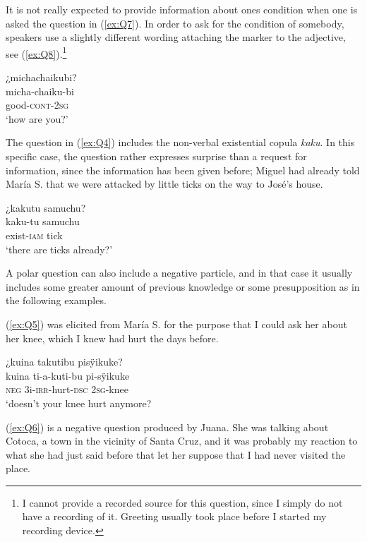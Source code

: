 It is not really expected to provide information about ones condition when one is asked the question in (\ref{ex:Q7}). In order to ask for the condition of somebody, speakers use a slightly different wording attaching the  marker to the adjective, see (\ref{ex:Q8}).\footnote{I cannot provide a recorded source for this question, since I simply do not have a recording of it. Greeting usually took place before I started my recording device.}

\ea\label{ex:Q8}
\begingl
\glpreamble ¿michachaikubi?\\
\gla micha-chaiku-bi\\
\glb good-\textsc{cont}-2\textsc{sg}\\
\glft ‘how are you?’
\endgl
\xe

The question in (\ref{ex:Q4}) includes the non-verbal existential copula \textit{kaku}. In this specific case, the question rather expresses surprise than a request for information, since the information has been given before; Miguel had already told María S. that we were attacked by little ticks on the way to José’s house. 

\ea\label{ex:Q4}
\begingl
\glpreamble ¿kakutu samuchu?\\
\gla kaku-tu samuchu\\
\glb exist-\textsc{iam} tick\\
\glft ‘there are ticks already?’
\endgl
\trailingcitation{[mrx-c120509l.149]}
\xe

A polar question can also include a negative particle, and in that case it usually includes some greater amount of previous knowledge or some presupposition as  in the following examples.

(\ref{ex:Q5}) was elicited from María S. for the purpose that I could ask her about her knee, which I knew had hurt the days before.

\ea\label{ex:Q5}
\begingl
\glpreamble ¿kuina takutibu pisÿikuke?\\
\gla kuina ti-a-kuti-bu pi-sÿikuke\\
\glb \textsc{neg} 3i-\textsc{irr}-hurt-\textsc{dsc} 2\textsc{sg}-knee\\
\glft ‘doesn’t your knee hurt anymore?
\endgl
\trailingcitation{[rxx-e181022le]}
\xe

(\ref{ex:Q6}) is a negative question produced by Juana. She was talking about Cotoca, a town in the vicinity of Santa Cruz, and it was probably my reaction to what she had just said before that let her suppose that I had never visited the place.

